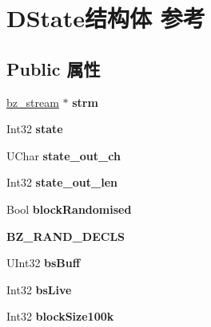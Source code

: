 \hypertarget{struct_d_state}{}\section{D\+State结构体 参考}
\label{struct_d_state}
\subsection*{Public 属性}
\begin{DoxyCompactItemize}
\item 
\mbox{\label{struct_d_state_a083c2502fe1db2e0903cccb4de54efd1}} 
\hyperlink{structbz__stream}{bz\+\_\+stream} $\ast$ {\bfseries strm}
\item 
\mbox{\label{struct_d_state_a70a740d52793a3933adfc46aeb3f41cb}} 
Int32 {\bfseries state}
\item 
\mbox{\label{struct_d_state_aae326a8636a1e915486845b618582251}} 
U\+Char {\bfseries state\+\_\+out\+\_\+ch}
\item 
\mbox{\label{struct_d_state_a692445b35df22bc814c264fbe3ed7fda}} 
Int32 {\bfseries state\+\_\+out\+\_\+len}
\item 
\mbox{\label{struct_d_state_af18fc51a50bcba9c8badb3a432b124c9}} 
Bool {\bfseries block\+Randomised}
\item 
\mbox{\label{struct_d_state_a8c81979baebe9aed6d761d121dbb9066}} 
{\bfseries B\+Z\+\_\+\+R\+A\+N\+D\+\_\+\+D\+E\+C\+LS}
\item 
\mbox{\label{struct_d_state_ac8a8f1e3f3db538611317d24562ba0d8}} 
U\+Int32 {\bfseries bs\+Buff}
\item 
\mbox{\label{struct_d_state_ac366e057d6ff7173a2d2308d78e37cf7}} 
Int32 {\bfseries bs\+Live}
\item 
\mbox{\label{struct_d_state_ad0c76b25a2fdfb322db831658bbc41a7}} 
Int32 {\bfseries block\+Size100k}
\item 
\mbox{\label{struct_d_state_a196ce145a2825e34bf377547923702cc}} 

\end{DoxyCompactItemize}
